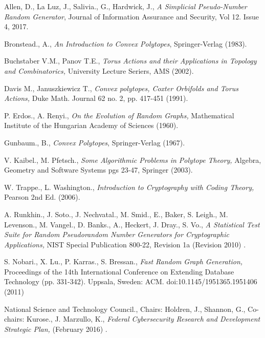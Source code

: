 \documentclass[oneside,12pt]{amsart}
\theoremstyle{definition}
\numberwithin{equation}{section}
\begin{document}
\clearpage
\begin{thebibliography}{14}

 Allen, D., La Luz, J., Salivia., G., Hardwick, J.,
{\emph{A Simplicial Pseudo-Number Random Generator}},
Journal of Information Assurance and Security, Vol 12. Issue 4, 2017.

 Bronstead., A.,
{\emph{An Introduction to Convex Polytopes}},
Springer-Verlag (1983).

 Buchstaber V.M., Panov T.E.,
 {\textit{Torus Actions and their Applications in Topology and Combinatorics,}}
 University Lecture Seriers, AMS (2002).

 Davis M., Januszkiewicz T.,
{\em{Convex polytopes, Coxter Orbifolds and Torus Actions,}} Duke
Math. Journal 62 no. 2, pp. 417-451 (1991).

 P. Erdos., A. Renyi.,
 {\textit{On the Evolution of Random Graphs,}}
 Mathematical Institute of the Hungarian Academy of Sciences (1960).

 Gunbaum., B.,
{\emph{Convex Polytopes}},
Springer-Verlag (1967).

 V. Kaibel., M. Pfetsch.,
 {\textit{Some Algorithmic Problems in Polytope Theory,}}
 Algebra, Geometry and Software Systems pgs 23-47, Springer (2003).

 W. Trappe., L. Washington.,
 {\textit{Introduction to Cryptography with Coding Theory,}}
 Pearson 2nd Ed. (2006).

 A. Runkhin., J. Soto., J. Nechvatal., M. Smid., E., Baker, S. Leigh., M. Levenson., M. Vangel.,
D. Banks., A., Heckert, J. Dray., S. Vo.,
 {\textit{A Statistical Test Suite for Random Pseudorandom Number Generators for Cryptographic Applications,}}
 NIST Special Publication 800-22, Revision 1a (Revision 2010) .

 S. Nobari., X. Lu., P. Karras., S. Bressan.,
{\textit{Fast Random Graph Generation,}} Proceedings of the 14th International Conference on Extending Database
Technology (pp. 331-342). Uppsala, Sweden: ACM. doi:10.1145/1951365.1951406  (2011)

 National Science and Technology Council., Chairs:  Holdren, J., Shannon, G., Co-chairs: Kurose., J. Marzullo, K.,
 {\textit{Federal Cybersecurity Research and Development Strategic Plan,}}
(February 2016) .




\end{thebibliography}
\end{document}
